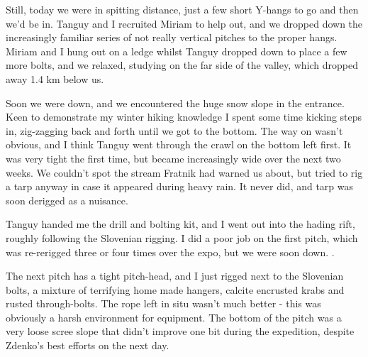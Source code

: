 Still, today we were in spitting distance, just a few short Y-hangs to go and then we'd be in. Tanguy and I recruited Miriam to help out, and we dropped down the increasingly familiar series of not really vertical pitches to the proper hangs. Miriam and I hung out on a ledge whilst Tanguy dropped down to place a few more bolts, and we relaxed, studying  on the far side of the  valley, which dropped away 1.4 km below us.


Soon we were down, and we encountered the huge snow slope in the entrance. Keen to demonstrate my winter hiking knowledge I spent some time kicking steps in, zig-zagging back and forth until we got to the bottom. The way on wasn't obvious, and I think Tanguy went through the crawl on the bottom left first. It was very tight the first time, but became increasingly wide over the next two weeks. We couldn't spot the stream Fratnik had warned us about, but tried to rig a tarp anyway in case it appeared during heavy rain. It never did, and tarp was soon derigged as a nuisance.

Tanguy handed me the drill and bolting kit, and I went out into the hading rift, roughly following the Slovenian rigging. I did a poor job on the first pitch, which was re-rerigged three or four times over the expo, but we were soon down. .

The next pitch has a tight pitch-head, and I just rigged next to the Slovenian bolts, a mixture of terrifying home made hangers, calcite encrusted krabs and rusted through-bolts. The rope left in situ wasn't much better - this was obviously a harsh environment for equipment. The bottom of the pitch was a very loose scree slope that didn't improve one bit during the expedition, despite Zdenko's best efforts on the next day.

